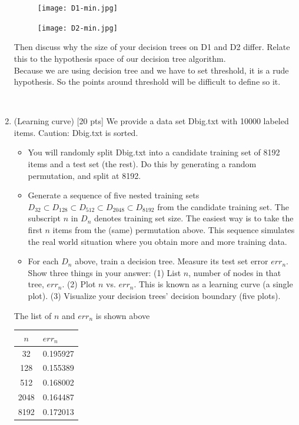 \documentclass[a4paper]{article}
\theoremstyle{definition}
\begin{document}
\begin{enumerate}
     \begin{figure}[H]
	       \centering
	        \texttt{[image: D1-min.jpg]}
	       \captionsetup{labelformat=empty}
	     \caption{}
	       \label{fig:my_label}
	   \end{figure}
	   
     \begin{figure}[H]
	       \centering
	        \texttt{[image: D2-min.jpg]}
	       \captionsetup{labelformat=empty}
	     \caption{}
	       \label{fig:my_label}
	   \end{figure}
  
Then discuss why the size of your decision trees on D1 and D2 differ.  Relate this to the hypothesis space of our decision tree algorithm. 
\\
\color{blue}
Because we are using decision tree and we have to set threshold, it is a rude  hypothesis. So the points around threshold will be difficult to define so it.

\\
\color{black}
\item (Learning curve)  [20 pts] We provide a data set Dbig.txt with 10000 labeled items.  Caution: Dbig.txt is sorted.
  \begin{itemize}
  \item You will randomly split Dbig.txt into a candidate training set of 8192 items and a test set (the rest).  Do this by generating a random permutation, and split at 8192.
  \item Generate a sequence of five nested training sets $D_{32} \subset D_{128} \subset D_{512} \subset D_{2048} \subset D_{8192}$ from the candidate training set.  The subscript $n$ in $D_n$ denotes training set size.  The easiest way is to take the first $n$ items from the (same) permutation above.  This sequence simulates the real world situation where you obtain more and more training data.
  \item For each $D_n$ above, train a decision tree.  Measure its test set error $err_n$.  Show three things in your answer: (1) List $n$, number of nodes in that tree, $err_n$. (2) Plot $n$ vs. $err_n$.  This is known as a learning curve (a single plot). (3) Visualize your decision trees' decision boundary (five plots).
  \end{itemize}
  
  \color{blue}
  The list of $n$ and $err_n$ is shown above
  
\begin{table}[]
\color{blue}
\centering
\begin{tabular}{cl}
\hline
$n$    & $err_n$    \\ \hline
32   & 0.195927 \\
128  & 0.155389 \\
512  & 0.168002 \\
2048 & 0.164487 \\
8192 & 0.172013 \\ \hline
\end{tabular}
\end{table}


\end{enumerate}
\end{document}
